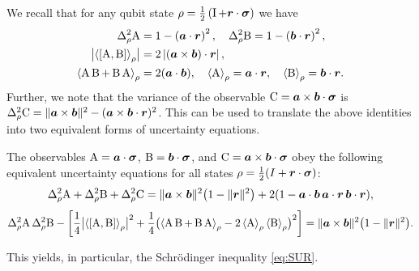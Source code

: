 We recall that
for any qubit state $\rho = \frac{1}{2}\left(\operatorname{I} + \bm{r}\cdot{\boldsymbol\sigma}\right)$ we have
\begin{align}
  \varr{\opa} &= 1-\left(\boa\cdot\bor\right)^2,\quad  \varr{\opb} = 1-\left(\bob\cdot\bor\right)^2,\\
  \bigl|\expr{\com{\opa}{\opb}}\bigr| &= 2\left|\left(\boa\times\bob\right)\cdot\bor\right|,\\
  \expr{\acom{\opa}{\opb}} &= 2(\boa\cdot\bob),\quad  \expr{\opa} = \boa\cdot\bor,\quad \expr{\opb} = \bob\cdot\bor.
\end{align}
Further, we note that the variance of the observable $\operatorname{C}=\bm{a}\times\bm{b}\cdot{\boldsymbol\sigma}$ is $\varr\opc=\|\boa\times\bob\|^2-(\boa\times\bob\cdot\bor)^2$.
This can be used to translate the above identities into two equivalent forms of uncertainty equations.
\begin{thm}\label{thm:3ur}
  The observables $\operatorname{A}=\bm{a}\cdot{\boldsymbol\sigma}$, $\operatorname{B}=\bm{b}\cdot{\boldsymbol\sigma}$, and $\operatorname{C}=\bm{a}\times\bm{b}\cdot{\boldsymbol\sigma}$ obey the following equivalent uncertainty equations for all states $\rho=\frac12(I+\bm{r}\cdot{\boldsymbol\sigma})$:
  \begin{equation}\label{eq:triple-ur}
    \varr\opa+\varr\opb+\varr\opc=\|\boa\times\bob\|^2\bigl(1-\|\bor\|^2\bigr)+2(1-\boa\cdot\bob\,\boa\cdot\bor\,\bob\cdot\bor),
  \end{equation}
\begin{equation}\label{eq:S-eq}
  \varr\opa\,\varr\opb-\left[\frac14 \bigl|\expr{\com{\opa}{\opb}}\bigr|^2+\frac14 \bigl(\expr{\acom{\opa}{\opb}}-2\expr{\opa}\expr{\opb}\bigr)^2\right]=\|\boa\times\bob\|^2\bigl(1-\|\bor\|^2\bigr).
\end{equation}
\end{thm}
\noindent This yields, in particular, the Schr\"odinger inequality \eqref{eq:SUR}.

